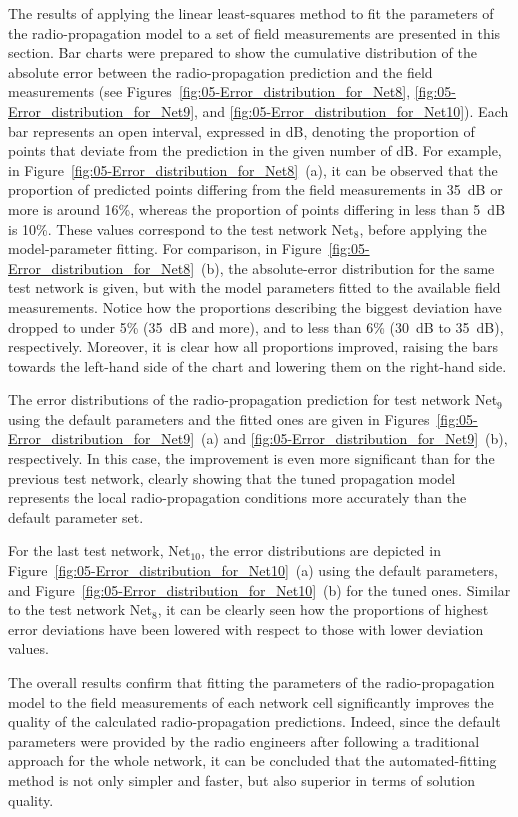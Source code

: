 The results of applying the linear least-squares method to fit the
parameters of the radio-propagation model to a set of field measurements
are presented in this section. Bar charts were prepared to show the
cumulative distribution of the absolute error between the radio-propagation
prediction and the field measurements (see Figures~\ref{fig:05-Error_distribution_for_Net8},
\ref{fig:05-Error_distribution_for_Net9}, and \ref{fig:05-Error_distribution_for_Net10}).
Each bar represents an open interval, expressed in dB, denoting the
proportion of points that deviate from the prediction in the given
number of dB. For example, in Figure~\ref{fig:05-Error_distribution_for_Net8}~(a),
it can be observed that the proportion of predicted points differing
from the field measurements in 35~dB or more is around 16\%, whereas
the proportion of points differing in less than 5~dB is 10\%. These
values correspond to the test network Net$_{8}$, before applying
the model-parameter fitting. For comparison, in Figure~\ref{fig:05-Error_distribution_for_Net8}~(b),
the absolute-error distribution for the same test network is given,
but with the model parameters fitted to the available field measurements.
Notice how the proportions describing the biggest deviation have dropped
to under 5\% (35~dB and more), and to less than 6\% (30~dB to 35~dB),
respectively. Moreover, it is clear how all proportions improved,
raising the bars towards the left-hand side of the chart and lowering
them on the right-hand side.

The error distributions of the radio-propagation prediction for test
network Net$_{9}$ using the default parameters and the fitted ones
are given in Figures~\ref{fig:05-Error_distribution_for_Net9}~(a)
and \ref{fig:05-Error_distribution_for_Net9}~(b), respectively.
In this case, the improvement is even more significant than for the
previous test network, clearly showing that the tuned propagation
model represents the local radio-propagation conditions more accurately
than the default parameter set.

For the last test network, Net$_{10}$, the error distributions are
depicted in Figure~\ref{fig:05-Error_distribution_for_Net10}~(a)
using the default parameters, and Figure~\ref{fig:05-Error_distribution_for_Net10}~(b)
for the tuned ones. Similar to the test network Net$_{8}$, it can
be clearly seen how the proportions of highest error deviations have
been lowered with respect to those with lower deviation values. 

The overall results confirm that fitting the parameters of the radio-propagation
model to the field measurements of each network cell significantly
improves the quality of the calculated radio-propagation predictions.
Indeed, since the default parameters were provided by the radio engineers
after following a traditional approach for the whole network, it can
be concluded that the automated-fitting method is not only simpler
and faster, but also superior in terms of solution quality.

